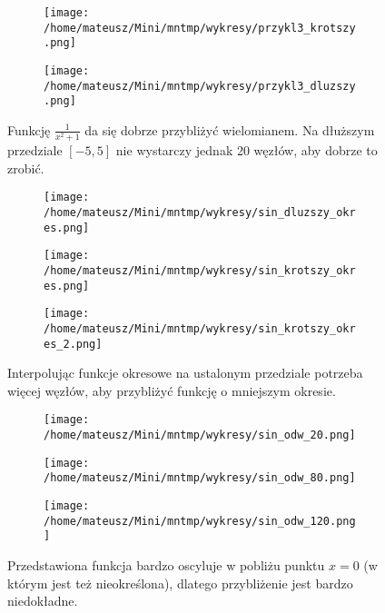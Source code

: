 \documentclass{article}
\begin{document}
	\begin{figure}
		\centering
		\begin{subfigure}{\textwidth}
			\centering
			\texttt{[image: /home/mateusz/Mini/mntmp/wykresy/przykl3\_krotszy.png]}
		\end{subfigure}
		\hfill
		\begin{subfigure}{\textwidth}
			\centering
			\texttt{[image: /home/mateusz/Mini/mntmp/wykresy/przykl3\_dluzszy.png]}
		\end{subfigure}
		\caption{Funkcję $\frac{1}{x^2+1}$ da się dobrze przybliżyć wielomianem. Na dłuższym przedziale $[-5, 5]$ nie wystarczy jednak 20 węzłów, aby dobrze to zrobić.}
	\end{figure}
	
	\begin{figure}
		\centering
		\begin{subfigure}{\textwidth}
			\centering
			\texttt{[image: /home/mateusz/Mini/mntmp/wykresy/sin\_dluzszy\_okres.png]}
		\end{subfigure}
		\hfill
		\begin{subfigure}{\textwidth}
			\centering
			\texttt{[image: /home/mateusz/Mini/mntmp/wykresy/sin\_krotszy\_okres.png]}
		\end{subfigure}
		\hfill
		\begin{subfigure}{\textwidth}
			\centering
			\texttt{[image: /home/mateusz/Mini/mntmp/wykresy/sin\_krotszy\_okres\_2.png]}
		\end{subfigure}
		\caption{Interpolując funkcje okresowe na ustalonym przedziale potrzeba więcej węzłów, aby przybliżyć funkcję o mniejszym okresie.}
	\end{figure}

	\begin{figure}
		\centering
		\begin{subfigure}{0.9\textwidth}
			\centering					
			\texttt{[image: /home/mateusz/Mini/mntmp/wykresy/sin\_odw\_20.png]}			
		\end{subfigure}
		\hfill
		\begin{subfigure}{0.9\textwidth}
			\centering					
			\texttt{[image: /home/mateusz/Mini/mntmp/wykresy/sin\_odw\_80.png]}			
		\end{subfigure}
		\hfill
			\begin{subfigure}{0.9\textwidth}
			\centering					
			\texttt{[image: /home/mateusz/Mini/mntmp/wykresy/sin\_odw\_120.png]}
		\end{subfigure}
		\caption{Przedstawiona funkcja bardzo oscyluje w pobliżu punktu $x=0$ (w którym jest też nieokreślona), dlatego przybliżenie jest bardzo niedokładne.}
	\end{figure}
\end{document}
